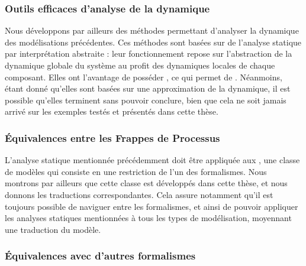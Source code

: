 \subsubsection{Outils efficaces d'analyse de la dynamique}

Nous développons par ailleurs des méthodes permettant d'analyser la dynamique
des modélisations précédentes.
Ces méthodes sont basées sur de l'analyse statique par interprétation abstraite :
leur fonctionnement repose sur l'abstraction de la dynamique globale du système
au profit des dynamiques locales de chaque composant.
Elles ont l'avantage de posséder ,
ce qui permet de .
Néanmoins, étant donné qu'elles sont basées sur une approximation de la dynamique,
il est possible qu'elles terminent sans pouvoir conclure,
bien que cela ne soit jamais arrivé sur les exemples testés et présentés dans cette thèse.

\subsubsection{Équivalences entre les Frappes de Processus}

L'analyse statique mentionnée précédemment doit être appliquée
aux ,
une classe de modèles qui consiste en une restriction de l'un des formalismes.
Nous montrons par ailleurs que cette classe est
 développés dans cette thèse,
et nous donnons les traductions correspondantes.
Cela assure notamment qu'il est toujours possible de naviguer entre les formalismes,
et ainsi de pouvoir appliquer les analyses statiques mentionnées à tous les types
de modélisation, moyennant une traduction du modèle.

\subsubsection{Équivalences avec d'autres formalismes}

